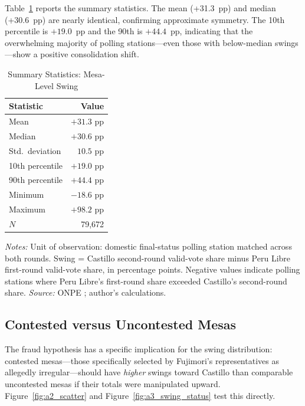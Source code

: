Table~\ref{tab:a1_swing_stats} reports the summary statistics.
The mean (+31.3~pp) and median (+30.6~pp) are nearly identical,
confirming approximate symmetry. The 10th percentile is $+19.0$~pp
and the 90th is $+44.4$~pp, indicating that the overwhelming majority
of polling stations---even those with below-median swings---show a
positive consolidation shift.

\begin{table}[H]
\centering
\caption{Summary Statistics: Mesa-Level Swing}
\label{tab:a1_swing_stats}
\begin{tabular}{lr}
\toprule
Statistic & Value \\
\midrule
Mean   & $+31.3$ pp \\
Median & $+30.6$ pp \\
Std.\ deviation & $10.5$ pp \\
10th percentile & $+19.0$ pp \\
90th percentile & $+44.4$ pp \\
Minimum & $-18.6$ pp \\
Maximum & $+98.2$ pp \\
\midrule
$N$ & 79,672 \\
\bottomrule
\end{tabular}
\vspace{0.2cm}
\begin{minipage}{\textwidth}
\footnotesize
\textit{Notes:} Unit of observation: domestic final-status polling station
matched across both rounds. Swing = Castillo second-round valid-vote share
minus Peru Libre first-round valid-vote share, in percentage points.
Negative values indicate polling stations where Peru Libre's first-round
share exceeded Castillo's second-round share.
\textit{Source:} ONPE \citep{onpe2021, onpe2021a}; author's calculations.
\end{minipage}
\end{table}

\subsection{Contested versus Uncontested Mesas}
\label{app:swing:contested}

The fraud hypothesis has a specific implication for the swing distribution:
contested mesas---those specifically selected by Fujimori's representatives
as allegedly irregular---should have \emph{higher} swings toward Castillo
than comparable uncontested mesas if their totals were manipulated upward.
Figure~\ref{fig:a2_scatter} and Figure~\ref{fig:a3_swing_status} test this
directly.

